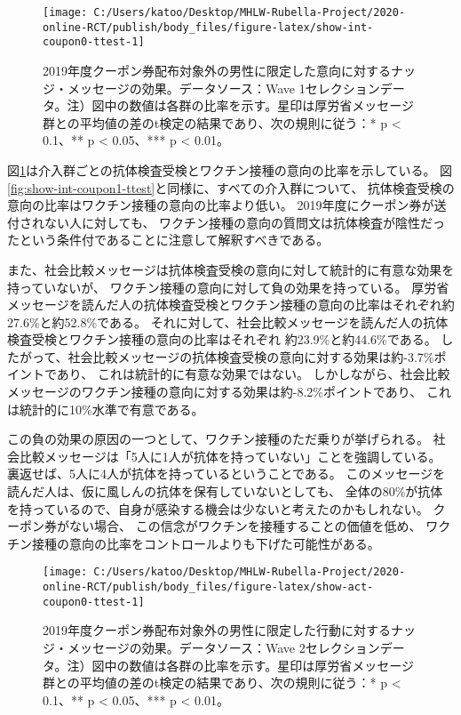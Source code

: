 \documentclass[
  11pt,
  a4paper,
]{article}
\begin{document}
\begin{figure}[t]
\texttt{[image: C:/Users/katoo/Desktop/MHLW-Rubella-Project/2020-online-RCT/publish/body\_files/figure-latex/show-int-coupon0-ttest-1]} \caption{2019年度クーポン券配布対象外の男性に限定した意向に対するナッジ・メッセージの効果。データソース：Wave 1セレクションデータ。注）図中の数値は各群の比率を示す。星印は厚労省メッセージ群との平均値の差のt検定の結果であり、次の規則に従う：* p < 0.1、** p < 0.05、*** p < 0.01。}\label{fig:show-int-coupon0-ttest}
\end{figure}

図\ref{fig:show-int-coupon0-ttest}は介入群ごとの抗体検査受検とワクチン接種の意向の比率を示している。
図\ref{fig:show-int-coupon1-ttest}と同様に、すべての介入群について、
抗体検査受検の意向の比率はワクチン接種の意向の比率より低い。
2019年度にクーポン券が送付されない人に対しても、
ワクチン接種の意向の質問文は抗体検査が陰性だったという条件付であることに注意して解釈すべきである。

また、社会比較メッセージは抗体検査受検の意向に対して統計的に有意な効果を持っていないが、
ワクチン接種の意向に対して負の効果を持っている。
厚労省メッセージを読んだ人の抗体検査受検とワクチン接種の意向の比率はそれぞれ約27.6\%と約52.8\%である。
それに対して、社会比較メッセージを読んだ人の抗体検査受検とワクチン接種の意向の比率はそれぞれ
約23.9\%と約44.6\%である。
したがって、社会比較メッセージの抗体検査受検の意向に対する効果は約-3.7\%ポイントであり、
これは統計的に有意な効果ではない。
しかしながら、社会比較メッセージのワクチン接種の意向に対する効果は約-8.2\%ポイントであり、
これは統計的に10\%水準で有意である。

この負の効果の原因の一つとして、ワクチン接種のただ乗りが挙げられる。
社会比較メッセージは「5人に1人が抗体を持っていない」ことを強調している。
裏返せば、5人に4人が抗体を持っているということである。
このメッセージを読んだ人は、仮に風しんの抗体を保有していないとしても、
全体の80\%が抗体を持っているので、自身が感染する機会は少ないと考えたのかもしれない。
クーポン券がない場合、
この信念がワクチンを接種することの価値を低め、
ワクチン接種の意向の比率をコントロールよりも下げた可能性がある。

\begin{figure}[t]
\texttt{[image: C:/Users/katoo/Desktop/MHLW-Rubella-Project/2020-online-RCT/publish/body\_files/figure-latex/show-act-coupon0-ttest-1]} \caption{2019年度クーポン券配布対象外の男性に限定した行動に対するナッジ・メッセージの効果。データソース：Wave 2セレクションデータ。注）図中の数値は各群の比率を示す。星印は厚労省メッセージ群との平均値の差のt検定の結果であり、次の規則に従う：* p < 0.1、** p < 0.05、*** p < 0.01。}\label{fig:show-act-coupon0-ttest}
\end{figure}
\end{document}
